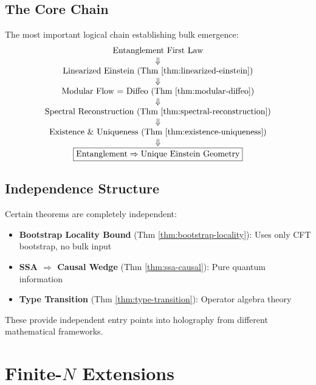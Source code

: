 \documentclass[12pt,a4paper]{article}
\begin{document}
\subsection{The Core Chain}

The most important logical chain establishing bulk emergence:
\begin{equation}
\begin{array}{c}
\text{Entanglement First Law} \\
\Downarrow \\
\text{Linearized Einstein (Thm \ref{thm:linearized-einstein})} \\
\Downarrow \\
\text{Modular Flow = Diffeo (Thm \ref{thm:modular-diffeo})} \\
\Downarrow \\
\text{Spectral Reconstruction (Thm \ref{thm:spectral-reconstruction})} \\
\Downarrow \\
\text{Existence \& Uniqueness (Thm \ref{thm:existence-uniqueness})} \\
\Downarrow \\
\boxed{\text{Entanglement} \Rightarrow \text{Unique Einstein Geometry}}
\end{array}
\end{equation}

\subsection{Independence Structure}

Certain theorems are completely independent:
\begin{itemize}
    \item \textbf{Bootstrap Locality Bound} (Thm \ref{thm:bootstrap-locality}): Uses only CFT bootstrap, no bulk input
    \item \textbf{SSA $\Rightarrow$ Causal Wedge} (Thm \ref{thm:ssa-causal}): Pure quantum information
    \item \textbf{Type Transition} (Thm \ref{thm:type-transition}): Operator algebra theory
\end{itemize}

These provide independent entry points into holography from different mathematical frameworks.

\section{Finite-$N$ Extensions}
\end{document}
